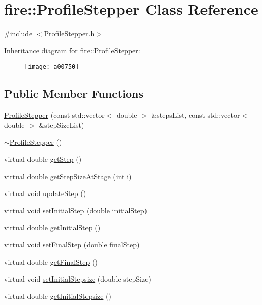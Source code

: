 \hypertarget{a00750}{}\section{fire\+:\+:Profile\+Stepper Class Reference}
\label{a00750}


{\ttfamily \#include $<$Profile\+Stepper.\+h$>$}

Inheritance diagram for fire\+:\+:Profile\+Stepper\+:\begin{figure}[H]
\begin{center}
\leavevmode
\texttt{[image: a00750]}
\end{center}
\end{figure}
\subsection*{Public Member Functions}
\begin{DoxyCompactItemize}
\item 
\hyperlink{a00750_a5bba5babbcb293b5e6a535cc4d06c55f}{Profile\+Stepper} (const std\+::vector$<$ double $>$ \&steps\+List, const std\+::vector$<$ double $>$ \&step\+Size\+List)
\item 
\hyperlink{a00750_a6838143d952dec2519a43c576a1f1546}{$\sim$\+Profile\+Stepper} ()
\item 
virtual double \hyperlink{a00750_a9096ad65a3fcf63678b600cbe0c33961}{get\+Step} ()
\item 
virtual double \hyperlink{a00750_adaa1a23c068977ecc6809dd8eecab49d}{get\+Step\+Size\+At\+Stage} (int i)
\item 
virtual void \hyperlink{a00750_a2c13fd4da5550f1e58df2b54bbfe4c2c}{update\+Step} ()
\item 
virtual void \hyperlink{a00750_adf2f78648d9539282225117c0fd243af}{set\+Initial\+Step} (double initial\+Step)
\item 
virtual double \hyperlink{a00750_af24660fa4bd027f877d5c1bdeb286cf5}{get\+Initial\+Step} ()
\item 
virtual void \hyperlink{a00750_af8203296b4f3bef53bafab7cb654cc97}{set\+Final\+Step} (double \hyperlink{a00750_a4f2347f039417fe9cdd16d3ca74a072d}{final\+Step})
\item 
virtual double \hyperlink{a00750_ae6f257aca7b3bb62a851169a01bcaacf}{get\+Final\+Step} ()
\item 
virtual void \hyperlink{a00750_a55c44fd97d8b6a474243ad0da48b039d}{set\+Initial\+Stepsize} (double step\+Size)
\item 
virtual double \hyperlink{a00750_a86e7035366907a08a36722655746271e}{get\+Initial\+Stepsize} ()
\end{DoxyCompactItemize}
